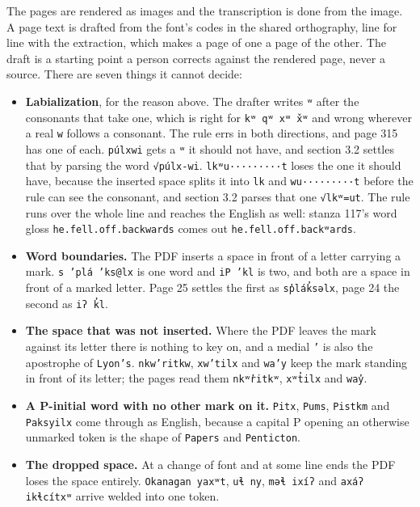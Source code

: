 The pages are rendered as images and the transcription is done from the image. A page text is drafted from the font's codes in the shared orthography, line for line with the extraction, which makes a page of one a page of the other. The draft is a starting point a person corrects against the rendered page, never a source. There are seven things it cannot decide:

\begin{itemize}
\item \textbf{Labialization}, for the reason above. The drafter writes \texttt{ʷ} after the consonants that take one, which is right for \texttt{kʷ qʷ xʷ x̌ʷ} and wrong wherever a real \texttt{w} follows a consonant. The rule errs in both directions, and page 315 has one of each. \texttt{púlxwi} gets a \texttt{ʷ} it should not have, and section 3.2 settles that by parsing the word \texttt{√púlx-wi}. \texttt{lkʷu·········t} loses the one it should have, because the inserted space splits it into \texttt{lk} and \texttt{wu·········t} before the rule can see the consonant, and section 3.2 parses that one \texttt{√lkʷ=ut}. The rule runs over the whole line and reaches the English as well: stanza 117's word gloss \texttt{he.fell.off.backwards} comes out \texttt{he.fell.off.backʷards}.
\item \textbf{Word boundaries.} The PDF inserts a space in front of a letter carrying a mark. \texttt{s ’plá ’ks@lx} is one word and \texttt{iP ’kl} is two, and both are a space in front of a marked letter. Page 25 settles the first as \texttt{sp̓lák̓səlx}, page 24 the second as \texttt{iʔ k̓l}.
\item \textbf{The space that was not inserted.} Where the PDF leaves the mark against its letter there is nothing to key on, and a medial \texttt{’} is also the apostrophe of \texttt{Lyon’s}. \texttt{nkw’ritkw}, \texttt{xw’tilx} and \texttt{wa’y} keep the mark standing in front of its letter; the pages read them \texttt{nkʷr̓itkʷ}, \texttt{xʷt̓ilx} and \texttt{way̓}.
\item \textbf{A P-initial word with no other mark on it.} \texttt{Pitx}, \texttt{Pums}, \texttt{Pistkm} and \texttt{Paksyilx} come through as English, because a capital P opening an otherwise unmarked token is the shape of \texttt{Papers} and \texttt{Penticton}.
\item \textbf{The dropped space.} At a change of font and at some line ends the PDF loses the space entirely. \texttt{Okanagan yaxʷt}, \texttt{uɬ ny}, \texttt{məɬ ixíʔ} and \texttt{axáʔ ikɬcítxʷ} arrive welded into one token.

\end{itemize}
